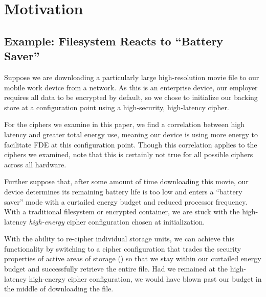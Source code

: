 \section{Motivation}\label{sec:motivation}

\subsection{Example: Filesystem Reacts to ``Battery Saver''}


Suppose we are downloading a particularly large high-resolution movie file to
our mobile work device from a network. As this is an enterprise device, our
employer requires all data to be encrypted by default, so we chose to initialize
our backing store at a configuration point using a high-security, high-latency
cipher.

For the ciphers we examine in this paper, we find a correlation between high
latency and greater total energy use, meaning our device is using more energy to
facilitate FDE at this configuration point. Though this correlation applies to
the ciphers we examined, note that this is certainly not true for all possible
ciphers across all hardware.

Further suppose that, after some amount of time downloading this movie, our
device determines its remaining battery life is too low and enters a ``battery
saver'' mode with a curtailed energy budget and reduced processor frequency.
With a traditional filesystem or encrypted container, we are stuck with the
high-latency \emph{high-energy} cipher configuration chosen at initialization.

With the ability to re-cipher individual storage units, we can achieve this
functionality by switching to a cipher configuration that trades the security
properties of active areas of storage () so that we stay within our
curtailed energy budget and successfully retrieve the entire file. Had we
remained at the high-latency high-energy cipher configuration, we would have
blown past our budget in the middle of downloading the file.

